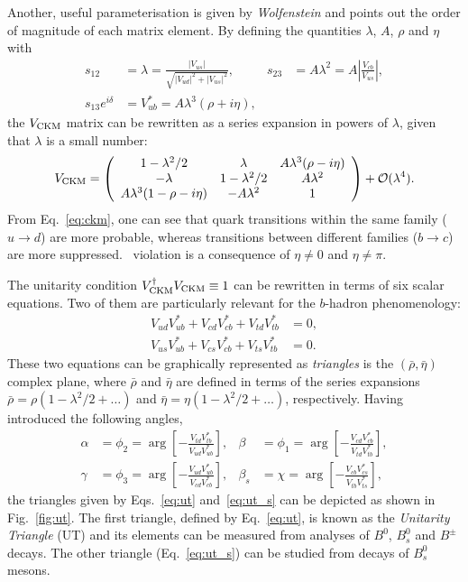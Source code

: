 Another, useful parameterisation is given by \emph{Wolfenstein} \cite{PRL-51-1983-1945} and points out the order of magnitude of each matrix element. By defining the quantities $\lambda$, $A$, $\rho$ and $\eta$ with
\begin{align}
	s_{12} &= \lambda = \frac{|V_{us}|}{\sqrt{|V_{ud}|^2+|V_{us}|^2}}, & s_{23} &= A\lambda^2=A\left|\frac{V_{cb}}{V_{us}}\right|, \\
	s_{13}e^{i\delta} &= V^{*}_{ub} = A\lambda^3(\rho+i\eta), 
\end{align}
the $V_{\rm CKM}$ matrix can be rewritten as a series expansion in powers of $\lambda$, given that $\lambda$ is a small number:
\begin{equation}
	\label{eq:ckm}
	V_{\rm CKM} = \left( \begin{array}{ccc} 1-\lambda^2/2 & \lambda & A\lambda^3(\rho-i\eta) \\ 
									-\lambda & 1-\lambda^2/2 & A\lambda^2 \\
									A\lambda^3(1-\rho-i\eta) & -A\lambda^2 & 1 \end{array} \right) + \mathcal O(\lambda^4).
\end{equation}
From Eq.~\ref{eq:ckm}, one can see that quark transitions within the same family (\eg $u\to d$) are more probable, whereas transitions between different families (\eg $b\to c$) are more suppressed. \CP~violation is a consequence of $\eta\neq0$ and $\eta\neq\pi$.

The unitarity condition $V_{\rm CKM}^\dagger V_{\rm CKM}\equiv 1$ can be rewritten in terms of six scalar equations. Two of them are particularly relevant for the $b$-hadron phenomenology:
\begin{align}
	\label{eq:ut}
	V_{ud}V_{ub}^* + V_{cd}V_{cb}^* + V_{td}V_{tb}^* &= 0, \\
	\label{eq:ut_s}
	V_{us}V_{ub}^* + V_{cs}V_{cb}^* + V_{ts}V_{tb}^* &= 0.
\end{align}
These two equations can be graphically represented as \emph{triangles} is the $(\bar\rho, \bar\eta)$ complex plane,
where $\bar\rho$ and $\bar\eta$ are defined in terms of the series expansions 
$\bar\rho=\rho(1-\lambda^2/2+\dots)$ and $\bar\eta=\eta(1-\lambda^2/2+\dots)$, respectively. 
Having introduced the following angles,
\begin{align}
	\label{eq:alpha_beta}
	\alpha &= \phi_2 = \arg\left[-\frac{V_{td}V_{tb}^*}{V_{ud}V_{ub}^*}\right], & \beta &= \phi_1 = \arg\left[-\frac{V_{cd}V_{cb}^*}{V_{td}V_{tb}^*}\right], \\
	\gamma &= \phi_3 = \arg\left[-\frac{V_{ud}V_{ub}^*}{V_{cd}V_{cb}^*}\right], & \beta_s &= \chi = \arg\left[-\frac{V_{cb}V_{cs}^*}{V_{tb}V_{ts}^*}\right],
\end{align}
the triangles given by Eqs.~\ref{eq:ut} and~\ref{eq:ut_s} can be depicted as shown in Fig.~\ref{fig:ut}. The first triangle, defined by Eq.~\ref{eq:ut}, is known as the \emph{Unitarity Triangle} (UT) and its elements can be
measured from analyses of $B^0$, $B^0_s$ and $B^{\pm}$ decays. The other triangle (Eq.~\ref{eq:ut_s}) can be studied from decays of $B^0_s$ mesons.

